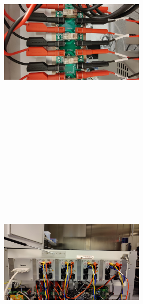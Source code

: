 \begin{figure}[h]
    
    \begin{subfigure}[b]{0.45\textwidth}
        \centering
        \includegraphics[width=7cm,height=10cm,keepaspectratio]{Figures/test/connections-3.jpg}
        \caption{}\label{fig:peltier1}
    \end{subfigure}
    ~
    \begin{subfigure}[b]{0.45\textwidth}
        \centering
        \includegraphics[width=7cm,height=10cm,keepaspectratio]{Figures/test/connections-6.jpg}
        \caption{}\label{fig:peltier2}
    \end{subfigure}


\end{figure}
